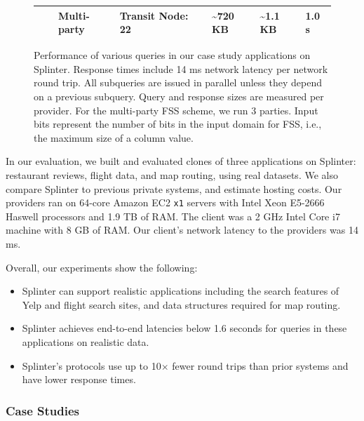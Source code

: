 \begin{figure}
{\begin{tabular}{llllp{1cm}p{2cm}p{2cm}p{1.5cm}}
			& & Multi-party & Transit Node: 22 & & \textasciitilde 720 KB & \textasciitilde 1.1 KB & 1.0 s \\
			\bottomrule
		\end{tabular}
	}
	\caption[Performance results for Splinter case studies.]{Performance of various queries in our case study applications on Splinter. 
		Response times include 14 ms network latency per network round trip. All subqueries are issued in parallel
		unless they depend on a previous subquery. Query and response sizes are measured per provider. For the multi-party FSS scheme, we run 3 parties.
		Input bits represent the number of bits in the input domain for FSS, i.e., the maximum size of a column value.}
	\label{fig:big-results}
\end{figure}

In our evaluation, we built and evaluated clones of three applications 
on Splinter: restaurant reviews, flight data, and map routing, using real datasets.
We also compare Splinter to previous private systems, and estimate hosting costs.
Our providers ran on 64-core Amazon EC2 \texttt{x1} servers with Intel Xeon E5-2666 Haswell processors and 1.9 TB 
of RAM. The client was a 2 GHz Intel Core i7 machine with 8 GB of RAM.
Our client's network latency to the providers was 14 ms.

Overall, our experiments show the following: 
\begin{itemize}
	\item{Splinter can support realistic applications including the search features of Yelp and flight search sites, and data structures
		required for map routing.}
	\item{Splinter achieves end-to-end latencies below 1.6 seconds for queries in these applications on realistic data.}
	\item{Splinter's protocols use up to 10$\times$ fewer round trips than prior systems and have lower response times.}
\end{itemize}


\subsubsection{Case Studies}
\label{sec:case_studies}

